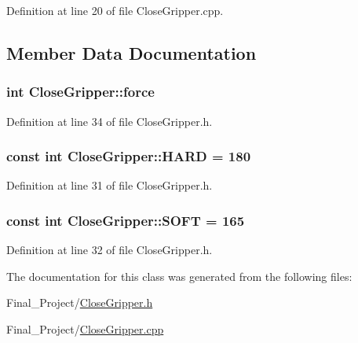 Definition at line 20 of file Close\-Gripper.\-cpp.



\subsection{Member Data Documentation}
\hypertarget{classCloseGripper_ac90b3c4ad2ba86181bdfa5a3f926593c}{
\subsubsection[{force}]{\setlength{\rightskip}{0pt plus 5cm}int Close\-Gripper\-::force\hspace{0.3cm}{\ttfamily [private]}}}\label{classCloseGripper_ac90b3c4ad2ba86181bdfa5a3f926593c}


Definition at line 34 of file Close\-Gripper.\-h.

\hypertarget{classCloseGripper_af1d1dab59b0bddacb0e82e676e47797a}{
\subsubsection[{H\-A\-R\-D}]{\setlength{\rightskip}{0pt plus 5cm}const int Close\-Gripper\-::\-H\-A\-R\-D = 180\hspace{0.3cm}{\ttfamily [static]}}}\label{classCloseGripper_af1d1dab59b0bddacb0e82e676e47797a}


Definition at line 31 of file Close\-Gripper.\-h.

\hypertarget{classCloseGripper_a2b6cac5f41e2d57f180fdcf18aacae45}{
\subsubsection[{S\-O\-F\-T}]{\setlength{\rightskip}{0pt plus 5cm}const int Close\-Gripper\-::\-S\-O\-F\-T = 165\hspace{0.3cm}{\ttfamily [static]}}}\label{classCloseGripper_a2b6cac5f41e2d57f180fdcf18aacae45}


Definition at line 32 of file Close\-Gripper.\-h.



The documentation for this class was generated from the following files\-:\begin{DoxyCompactItemize}
\item 
Final\-\_\-\-Project/\hyperlink{CloseGripper_8h}{Close\-Gripper.\-h}\item 
Final\-\_\-\-Project/\hyperlink{CloseGripper_8cpp}{Close\-Gripper.\-cpp}\end{DoxyCompactItemize}
